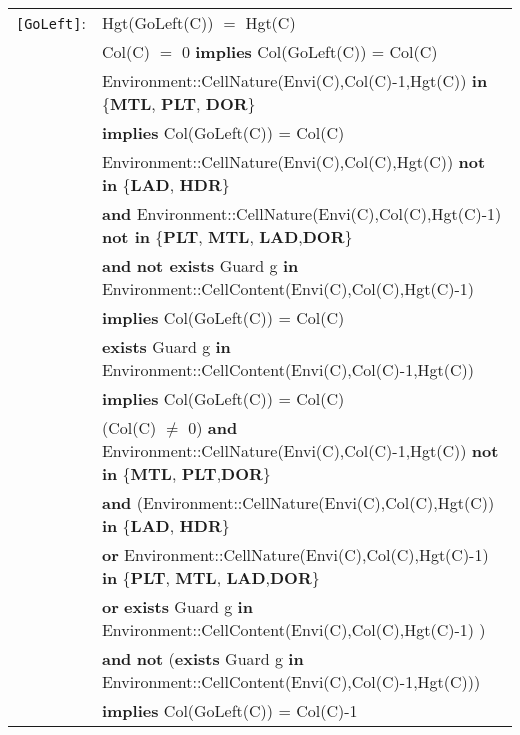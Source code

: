 \documentclass[7pt]{article}
\begin{document}
\begin{tabular}{rl}
\texttt{[GoLeft]}: & \textrm{Hgt(GoLeft(C))} $=$ \textrm{Hgt(C)} \\
& \textrm{Col(C)} $=$ 0 \textbf{implies} \textrm{Col(GoLeft(C))} = \textrm{Col(C)} \\
& \textrm{Environment::CellNature(Envi(C),Col(C)-1,Hgt(C))} \textbf{in} \{\textbf{MTL}, \textbf{PLT}, \textbf{DOR}\} \\
& \quad \textbf{implies}  \textrm{Col(GoLeft(C))} = \textrm{Col(C)} \\
& \textrm{Environment::CellNature(Envi(C),Col(C),Hgt(C))} \textbf{not in} \{\textbf{LAD}, \textbf{HDR}\}
\\ & \quad\quad \textbf{and} \textrm{Environment::CellNature(Envi(C),Col(C),Hgt(C)-1)} \textbf{not in} \{\textbf{PLT}, \textbf{MTL}, \textbf{LAD},\textbf{DOR}\} \\
& \quad\quad \textbf{and} \textbf{not exists} \textrm{Guard} g \textbf{in} \textrm{Environment::CellContent(Envi(C),Col(C),Hgt(C)-1)} \\
& \quad\quad \textbf{implies} \textrm{Col(GoLeft(C))} = \textrm{Col(C)} \\
& \textbf{exists} \textrm{Guard} g \textbf{in} \textrm{Environment::CellContent(Envi(C),Col(C)-1,Hgt(C))} \\ & \quad\quad \textbf{implies} \textrm{Col(GoLeft(C))} = \textrm{Col(C)} \\
& (\textrm{Col(C)} $\neq$ 0) \textbf{and} \textrm{Environment::CellNature(Envi(C),Col(C)-1,Hgt(C))} \textbf{not in} \{\textbf{MTL}, \textbf{PLT},\textbf{DOR}\} \\
& \quad\quad \textbf{and} (\textrm{Environment::CellNature(Envi(C),Col(C),Hgt(C))} \textbf{in} \{\textbf{LAD}, \textbf{HDR}\} \\
& \quad\quad\quad\quad \textbf{or} \textrm{Environment::CellNature(Envi(C),Col(C),Hgt(C)-1)} \textbf{in} \{\textbf{PLT}, \textbf{MTL}, \textbf{LAD},\textbf{DOR}\} \\
& \quad\quad\quad\quad \textbf{or} \textbf{exists} \textrm{Guard} g \textbf{in} \textrm{Environment::CellContent(Envi(C),Col(C),Hgt(C)-1)} ) \\
& \quad\quad \textbf{and} \textbf{not} (\textbf{exists} \textrm{Guard} g \textbf{in} \textrm{Environment::CellContent(Envi(C),Col(C)-1,Hgt(C))}) \\
& \quad\quad \textbf{implies} \textrm{Col(GoLeft(C))} = \textrm{Col(C)}-1 \\


\end{tabular}
\end{document}
